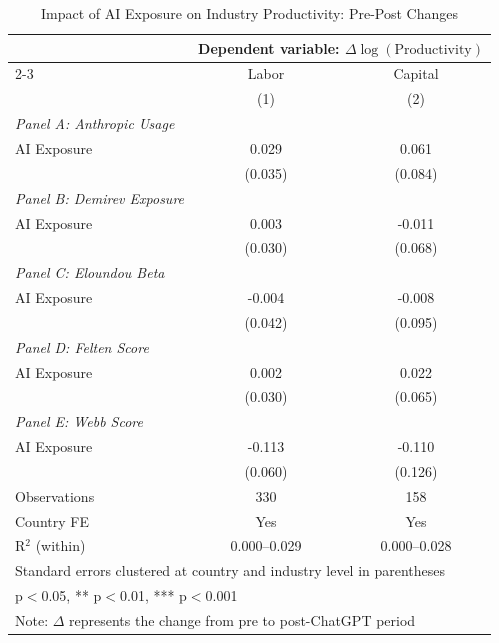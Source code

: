 \documentclass[11pt]{article}
\begin{document}
\begin{table}[H]
\centering
\caption{Impact of AI Exposure on Industry Productivity: Pre-Post Changes}
\begin{tabular}{lcc}
\hline\hline
 & \multicolumn{2}{c}{Dependent variable: $\Delta \log(\text{Productivity})$} \\
\cmidrule{2-3}
 & Labor & Capital \\
 & (1) & (2) \\
\midrule
\textit{Panel A: Anthropic Usage} & & \\
AI Exposure & 0.029 & 0.061 \\
 & (0.035) & (0.084) \\
\midrule
\textit{Panel B: Demirev Exposure} & & \\
AI Exposure & 0.003 & -0.011 \\
 & (0.030) & (0.068) \\
\midrule
\textit{Panel C: Eloundou Beta} & & \\
AI Exposure & -0.004 & -0.008 \\
 & (0.042) & (0.095) \\
\midrule
\textit{Panel D: Felten Score} & & \\
AI Exposure & 0.002 & 0.022 \\
 & (0.030) & (0.065) \\
\midrule
\textit{Panel E: Webb Score} & & \\
AI Exposure & -0.113 & -0.110 \\
 & (0.060) & (0.126) \\
\midrule
Observations & 330 & 158 \\
Country FE & Yes & Yes \\
R$^2$ (within) & 0.000--0.029 & 0.000--0.028 \\
\hline\hline
\multicolumn{3}{l}{\footnotesize Standard errors clustered at country and industry level in parentheses} \\
\multicolumn{3}{l}{\footnotesize * p$<$0.05, ** p$<$0.01, *** p$<$0.001} \\
\multicolumn{3}{l}{\footnotesize Note: $\Delta$ represents the change from pre to post-ChatGPT period} \\
\end{tabular}
\label{table:industry_delta}
\end{table}

\end{document}
